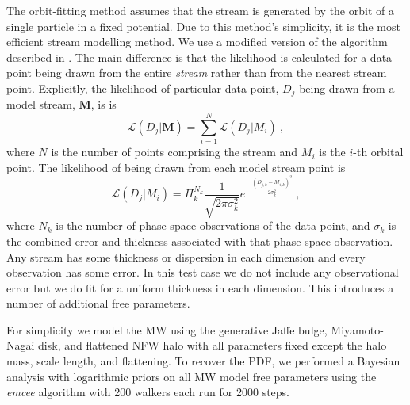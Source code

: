 
The orbit-fitting method assumes that the stream is generated by the orbit of a single particle in a fixed potential.  
Due to this method's simplicity, it is the most efficient stream modelling method.  We use a modified version of the 
algorithm described in \citet{Deg13}.  The main difference is that the likelihood is calculated for a data point being drawn 
from the entire \textit{stream} rather than from the nearest stream point.  Explicitly, the likelihood of particular 
data point, $D_{j}$ being drawn from a model stream, $\mathbf{M}$, is
is 
\begin{equation}
 \mathcal{L}(D_{j}|\mathbf{M})=\sum_{i=1}^{N}\mathcal{L}(D_{j}|M_{i})~,
\end{equation}
where $N$ is the number of points comprising the stream and $M_{i}$ is the $i$-th orbital point. The likelihood of being 
drawn from each model stream point is  
\begin{equation}
 \mathcal{L}(D_{j}|M_{i})=\Pi_{k}^{N_{k}}\frac{1}{\sqrt{2\pi\sigma_{k}^{2}}}
 e^{-\frac{(D_{j,k}-M_{i,k})^{2}}{2\sigma_{k}^{2}}}~,
\end{equation}
where $N_{k}$ is the number of phase-space observations of the data point, and $\sigma_{k}$ is the combined error and thickness 
associated with that phase-space observation.  Any stream has some thickness or dispersion in each dimension and every observation 
has some error.  In this test case we do not include any observational error but we do fit for a uniform thickness in each dimension.
This introduces a number of additional free parameters.

For simplicity we model the MW using the generative Jaffe bulge, Miyamoto-Nagai disk, and flattened NFW halo with 
all parameters fixed except the halo mass, scale length, and flattening.  To recover the PDF, we performed a Bayesian analysis with logarithmic priors on all 
MW model free parameters using the \textit{emcee} algorithm with 200 walkers each run for 2000 steps.
